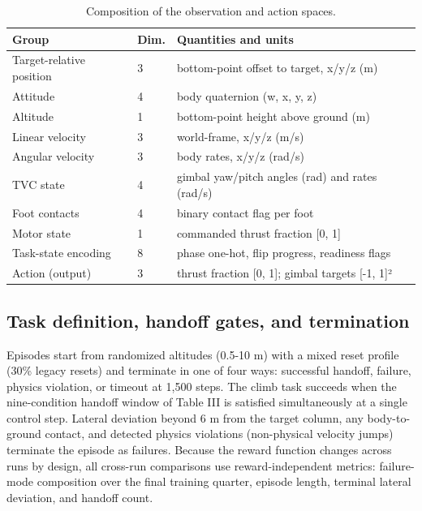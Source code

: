 \documentclass[11pt,a4paper]{article}
\begin{document}
\begin{table}[!ht]
\centering
\caption{Composition of the observation and action spaces.}
\label{tab:obs_action}
\vspace{1ex}
\begin{tabular}{lll}
\toprule
\textbf{Group} & \textbf{Dim.} & \textbf{Quantities and units} \\
\midrule
Target-relative position & 3 & bottom-point offset to target, x/y/z (m) \\
Attitude & 4 & body quaternion (w, x, y, z) \\
Altitude & 1 & bottom-point height above ground (m) \\
Linear velocity & 3 & world-frame, x/y/z (m/s) \\
Angular velocity & 3 & body rates, x/y/z (rad/s) \\
TVC state & 4 & gimbal yaw/pitch angles (rad) and rates (rad/s) \\
Foot contacts & 4 & binary contact flag per foot \\
Motor state & 1 & commanded thrust fraction [0, 1] \\
Task-state encoding & 8 & phase one-hot, flip progress, readiness flags \\
Action (output) & 3 & thrust fraction [0, 1]; gimbal targets [-1, 1]² \\
\bottomrule
\end{tabular}
\end{table}


\subsection{Task definition, handoff gates, and termination}

Episodes start from randomized altitudes (0.5-10 m) with a mixed reset profile (30\% legacy resets) and terminate in one of four ways: successful handoff, failure, physics violation, or timeout at 1,500 steps. The climb task succeeds when the nine-condition handoff window of Table III is satisfied simultaneously at a single control step. Lateral deviation beyond 6 m from the target column, any body-to-ground contact, and detected physics violations (non-physical velocity jumps) terminate the episode as failures. Because the reward function changes across runs by design, all cross-run comparisons use reward-independent metrics: failure-mode composition over the final training quarter, episode length, terminal lateral deviation, and handoff count.
\end{document}
